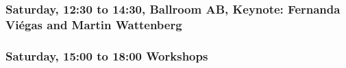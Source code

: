 \subsubsection*{Saturday, 12:30 to 14:30, Ballroom AB, Keynote: Fernanda Viégas and Martin Wattenberg }

\subsubsection*{Saturday, 15:00 to 18:00 Workshops}









